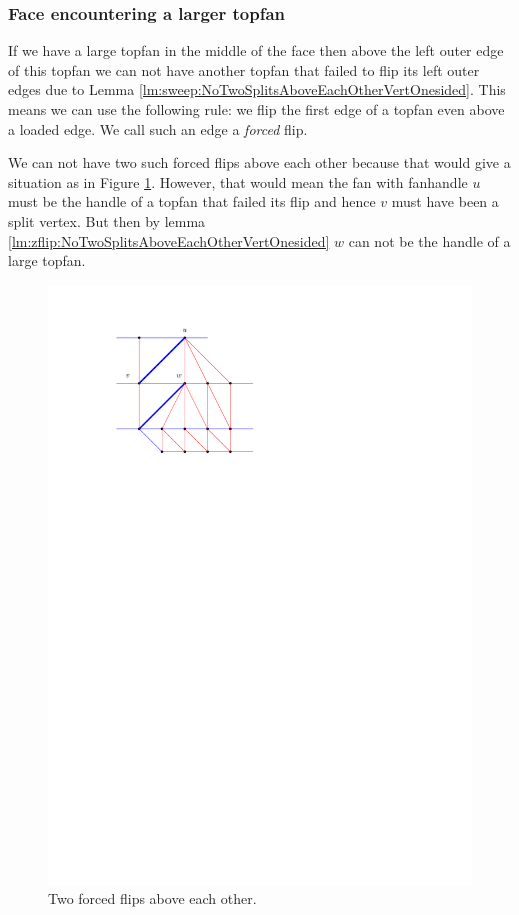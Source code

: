 \subsubsection{Face encountering a larger topfan}
  If we have a large topfan in the middle of the face then above the left outer edge of this topfan we can not have another topfan that failed to flip its left outer edges due to Lemma \ref{lm:sweep:NoTwoSplitsAboveEachOtherVertOnesided}.
  This means we can use the following rule: we flip the first edge of a topfan even above a loaded edge.
  We call such an edge a \emph{forced} flip.

  We can not have two such forced flips above each other because that would give a situation as in Figure \ref{fig:subdiv:forcedFlips}.
  However, that would mean the fan with fanhandle $u$ must be the handle of a topfan that failed its flip and hence $v$ must have been a split vertex. But then by lemma \ref{lm:zflip:NoTwoSplitsAboveEachOtherVertOnesided} $w$ can not be the handle of a large topfan.

  \begin{figure}[t]
    \centering
    \includegraphics[scale=1]{blueFaceSubdivision/img/forcedFlips.pdf}
    \caption{Two forced flips above each other.}
    \label{fig:subdiv:forcedFlips}
  \end{figure}

